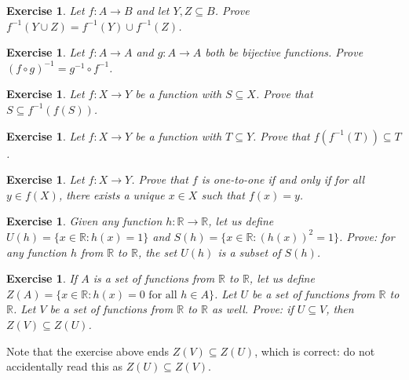 \documentclass{book}
\newcounter{ekcounter}%
\theoremstyle{ekimcustom}
\newtheorem{exercise}[ekcounter]{Exercise}
\begin{document}
\begin{exercise}
Let $f : A \to B$ and let $Y, Z \subseteq B$. Prove $f^{-1}(Y \cup Z) = f^{-1}(Y) \cup f^{-1}(Z)$. %
\end{exercise}

\begin{exercise}
Let $f : A \to A$ and $g : A \to A$ both be bijective functions. Prove $(f \circ g)^{-1} = g^{-1} \circ f^{-1}$. %
\end{exercise}


\begin{exercise}
Let $f : X \to Y$ be a function with $S \subseteq X$. Prove that $S \subseteq f^{-1}(f(S))$.%
\end{exercise}

\begin{exercise}
Let $f : X \to Y$ be a function with $T \subseteq Y$. Prove that $f(f^{-1}(T)) \subseteq T$. %
\end{exercise}

\begin{exercise}
Let $f : X \to Y$. Prove that $f$ is one-to-one if and only if for all $y \in f(X)$, there exists a unique $x \in X$ such that $f(x)=y$.%
\end{exercise}


\begin{exercise}
Given any function $h : \mathbb{R} \to \mathbb{R}$, let us define $U(h) = \{x \in \mathbb{R} : h(x)=1\}$ and $S(h) = \{x \in \mathbb{R} : (h(x))^2=1\}$. Prove: for any function $h$ from $\mathbb{R}$ to $\mathbb{R}$, the set $U(h)$ is a subset of $S(h)$.
\end{exercise}

\begin{exercise}
If $A$ is a set of functions from $\mathbb{R}$ to $\mathbb{R}$, let us define $Z(A) = \{x \in \mathbb{R} : h(x)=0 \text{ for all } h \in A\}$. Let $U$ be a set of functions from $\mathbb{R}$ to $\mathbb{R}$. Let $V$ be a set of functions from  $\mathbb{R}$ to $\mathbb{R}$ as well. Prove: if $U \subseteq V$, then $Z(V) \subseteq Z(U)$.
\end{exercise}
Note that the exercise above ends $Z(V) \subseteq Z(U)$, which is correct: do not accidentally read this as $Z(U) \subseteq Z(V)$.
\end{document}
